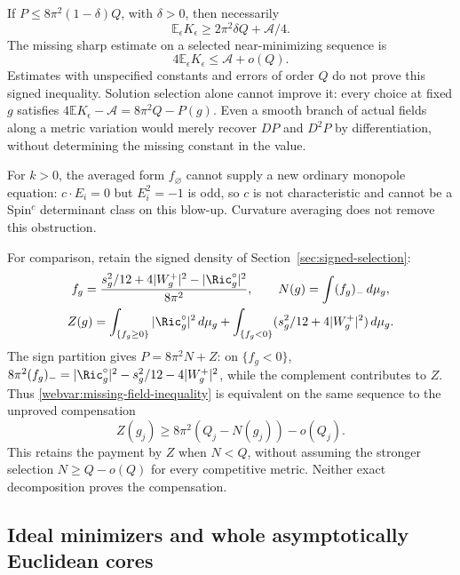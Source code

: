 If $P\le8\pi^2(1-\delta)Q$, with $\delta>0$, then necessarily
\begin{equation}\label{webvar:necessary-kinetic-cost}
 \mathbb E_\epsilon K_\epsilon\ge2\pi^2\delta Q+\mathscr A/4.
\end{equation}
The missing sharp estimate on a selected near-minimizing sequence is
\begin{equation}\label{webvar:missing-field-inequality}
 4\mathbb E_\epsilon K_\epsilon\le\mathscr A+o(Q).
\end{equation}
Estimates with unspecified constants and errors of order $Q$ do
not prove this signed inequality.  Solution selection alone cannot
improve it: every choice at fixed $g$ satisfies
$4\mathbb E K_\epsilon-\mathscr A=8\pi^2Q-P(g)$.
Even a smooth branch of actual fields along a metric variation
would merely recover $DP$ and $D^2P$ by differentiation, without
determining the missing constant in the value.

For $k>0$, the averaged form $f_\varnothing$ cannot supply a new
ordinary monopole equation: $c\cdot E_i=0$ but $E_i^2=-1$ is odd,
so $c$ is not characteristic and cannot be a Spin$^c$ determinant
class on this blow-up.  Curvature averaging does not remove this obstruction.

For comparison, retain the signed density of
Section~\ref{sec:signed-selection}:
\begin{equation}\label{webvar:signed-density}
 \begin{gathered}
 f_g=\frac{s_g^2/12+4|W_g^+|^2-|\Ric_g^\circ|^2}{8\pi^2},
 \qquad N(g)=\int(f_g)_-\,d\mu_g,\\
 Z(g)=\int_{\{f_g\ge0\}}|\Ric_g^\circ|^2\,d\mu_g
       +\int_{\{f_g<0\}}(s_g^2/12+4|W_g^+|^2)\,d\mu_g.
 \end{gathered}
\end{equation}
The sign partition gives $P=8\pi^2N+Z$: on $\{f_g<0\}$,
$8\pi^2(f_g)_-=|\Ric_g^\circ|^2-s_g^2/12-4|W_g^+|^2$,
while the complement contributes to $Z$.
Thus \eqref{webvar:missing-field-inequality} is equivalent on the
same sequence to the unproved compensation
\begin{equation}\label{webvar:missing-geometric-inequality}
 Z(g_j)\ge8\pi^2(Q_j-N(g_j))-o(Q_j).
\end{equation}
This retains the payment by $Z$ when $N<Q$, without assuming the
stronger selection $N\ge Q-o(Q)$ for every competitive metric.
Neither exact decomposition proves the compensation.

\subsection{Ideal minimizers and whole asymptotically Euclidean cores}

